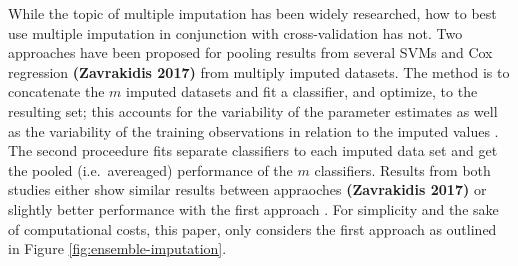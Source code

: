 \documentclass[12pt,]{article}
\begin{document}
While the topic of multiple imputation has been widely researched, how
to best use multiple imputation in conjunction with cross-validation has
not. Two approaches have been proposed for pooling results from several
SVMs \citep{belanche_handling_2014} and Cox regression
\textbf{(Zavrakidis 2017)} from multiply imputed datasets. The method is
to concatenate the \(m\) imputed datasets and fit a classifier, and
optimize, to the resulting set; this accounts for the variability of the
parameter estimates as well as the variability of the training
observations in relation to the imputed values
\citeyearpar{belanche_handling_2014}. The second proceedure fits
separate classifiers to each imputed data set and get the pooled
(i.e.~avereaged) performance of the \(m\) classifiers. Results from both
studies either show similar results between appraoches
\textbf{(Zavrakidis 2017)} or slightly better performance with the first
approach \citeyearpar{belanche_handling_2014}. For simplicity and the
sake of computational costs, this paper, only considers the first
approach as outlined in Figure \ref{fig:ensemble-imputation}.
\end{document}

